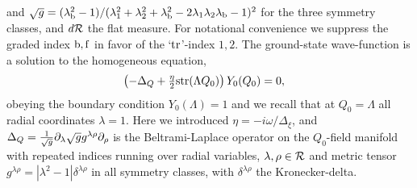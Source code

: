 \documentclass[twocolumn,showpacs,aps,prl]{revtex4}
\begin{document}
and 
$\sqrt{g}=(\lambda^2_{\rm b}-1)/(\lambda_1^2+\lambda_2^2+\lambda_{\rm b}^2-2\lambda_1\lambda_2\lambda_{\rm b}-1)^2$ 
for the three symmetry classes, and $d{\cal R}$ the flat measure.
For notational convenience we suppress the graded index ${\rm b,f}$ in favor of 
the `${\rm tr}$'-index $1,2$.  
The ground-state wave-function 
is a solution to the 
homogeneous equation,
\begin{align}
\label{tmeq}
\left(
-\Delta_Q + \tfrac{\eta}{2}  {\rm str}(\Lambda Q_0)
\right)
Y_0(Q_0)
&=0,
\end{align}
obeying the boundary condition 
$Y_0(\Lambda)=1$ and we recall that at 
$Q_0=\Lambda$ all radial coordinates $\lambda=1$. 
Here we introduced 
$\eta=-i\omega/\Delta_\xi$, and 
$\Delta_Q
=
{1\over \sqrt{g}}\partial_\lambda \sqrt{g} g^{\lambda\rho} \partial_{\rho}$ 
is the Beltrami-Laplace operator on the $Q_0$-field manifold 
with repeated indices running over radial variables, 
$\lambda, \rho  \in {\cal R}$
and 
 metric tensor $g^{\lambda \rho}=|\lambda^2-1|\delta^{\lambda\rho}$ in all symmetry classes, with 
$\delta^{\lambda\rho}$ the Kronecker-delta.
\end{document}
